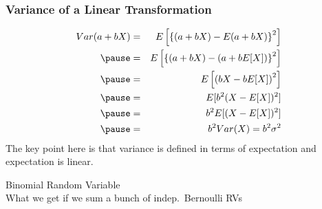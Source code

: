 \documentclass[handout]{beamer}
\begin{document}
\begin{frame}
\frametitle{Variance of a Linear Transformation}

\begin{eqnarray*}
 Var(a + bX) &=& E\left[\left\{(a+bX) - E(a+bX)\right\}^2 \right] \\ \pause
 	&=& E\left[\left\{(a+bX) - (a+bE[X])\right\}^2 \right] \\ \pause
 	&=&E\left[\left(bX - bE[X]\right)^2 \right] \\ \pause
 	&=&E[b^2 (X - E[X])^2]\\ \pause
 	&=& b^2 E[(X-E[X])^2]\\ \pause
 	&=& b^2 Var(X) = b^2 \sigma^2
\end{eqnarray*}
\alert{The key point here is that variance is defined in terms of expectation and expectation is linear.}

\end{frame}
\begin{frame}
	\begin{center}
		\Huge Binomial Random Variable	\\
		\large What we get if we sum a bunch of indep.\ Bernoulli RVs
	\end{center}
\end{frame}

\end{document}
